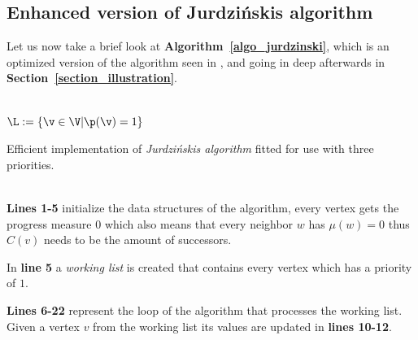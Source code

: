 \documentclass[12pt,oneside,bibliography=totoc,abstracton]{scrartcl}
\newcommand{\sectionref}[1]{\textbf{Section~\ref{#1}}}
\newcommand{\algoref}[1]{\textbf{Algorithm~\ref{#1}}}
\newcommand{\libref}[1]{\textbf{\cite{#1}}}
\begin{document}
\subsection{Enhanced version of Jurdzi\'nskis algorithm}
Let us now take a brief look at \algoref{algo_jurdzinski}, which is an optimized version of the algorithm
seen in \libref{simulation_general}, and going in deep afterwards in \sectionref{section_illustration}.\\\\
\IncMargin{1em}
\begin{algorithm}
$\L := \{\v \in \V | \p(\v) = 1\}$
\BlankLine
\BlankLine
{}
\BlankLine
\caption{Efficient implementation of \textit{Jurdzi\'nskis algorithm} fitted for use with three priorities.}\label{algo_jurdzinski}
\end{algorithm}\DecMargin{1em}\quad\\
\textbf{Lines 1-5} initialize the data structures of the algorithm, every vertex gets the progress measure $0$
which also means that every neighbor $w$ has $\mu(w) = 0$ thus $C(v)$ needs to be the amount of successors.

In \textbf{line 5} a \textit{working list} is created that contains every vertex which has a priority of $1$.

\textbf{Lines 6-22} represent the loop of the algorithm that processes the working list.
Given a vertex $v$ from the working list its values are updated in \textbf{lines 10-12}.
\end{document}
